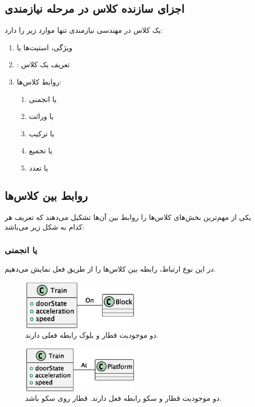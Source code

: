 \subsection{اجزای سازنده کلاس در مرحله نیازمندی}

یک کلاس در مهندسی نیازمندی تنها موارد زیر را دارد:

\begin{enumerate}
    \item ویژگی، استیت‌ها یا 
    \item {}: تعریف یک کلاس
    \item روابط کلاس‌ها:
    \begin{enumerate}
        \item {} یا انجمنی
        \item {} یا وراثت
        \item {} یا ترکیب
        \item {} یا تجمیع
        \item {} یا تعدد
    \end{enumerate}
\end{enumerate}

\subsection{روابط بین کلاس‌ها}

یکی از مهم‌ترین بخش‌های کلاس‌ها را روابط بین آن‌ها تشکیل می‌دهند که تعریف هر
کدام به شکل زیر می‌باشد:

\subsubsection{ یا انجمنی}

در این نوع ارتباط، رابطه بین کلاس‌ها را از طریق فعل نمایش می‌دهیم.

\begin{figure}[H]
    \centering
    \includegraphics[width=0.5\textwidth]{assets/classes/trainBlock.eps}
    \caption{دو موجودیت قطار و بلوک رابطه فعلی دارند.}
\end{figure}

\begin{figure}[H]
    \centering
    \includegraphics[width=0.5\textwidth]{assets/classes/trainPlatform.eps}
    \caption{دو موجودیت قطار و سکو رابطه فعل دارند. قطار روی سکو باشد.}
\end{figure}

